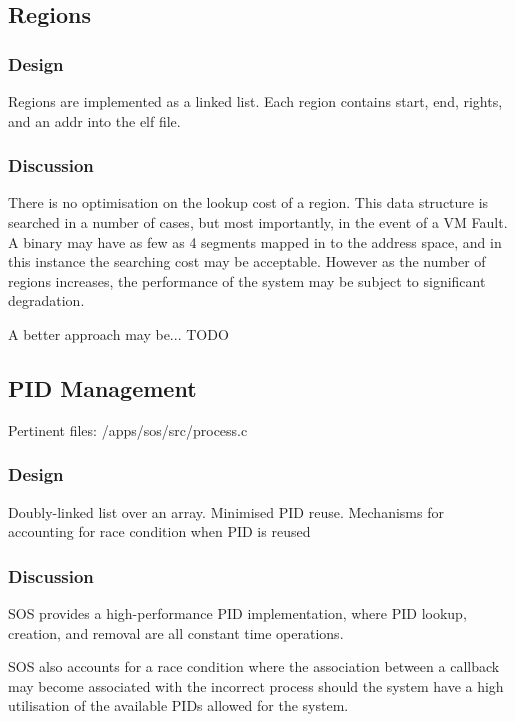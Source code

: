 \documentclass[a4paper,12pt]{article}
\begin{document}
\subsection{Regions}
\subsubsection{Design}
Regions are implemented as a linked list.  Each region contains start, end,
rights, and an addr into the elf file.
\subsubsection{Discussion}
There is no optimisation on the lookup cost of a region.  This data structure
is searched in a number of cases, but most importantly, in the event of a VM
Fault.  A binary may have as few as 4 segments mapped in to the address space,
and in this instance the searching cost may be acceptable.  However as the
number of regions increases, the performance of the system may be subject to
significant degradation.

A better approach may be... TODO

\subsection{PID Management}
Pertinent files: /apps/sos/src/process.c

\subsubsection{Design}
Doubly-linked list over an array.
Minimised PID reuse.
Mechanisms for accounting for race condition when PID is reused

\subsubsection{Discussion}
SOS provides a high-performance PID implementation, where PID lookup,
creation, and removal are all constant time operations.

SOS also accounts for a race condition where the association between a
callback may become associated with the incorrect process should the system
have a high utilisation of the available PIDs allowed for the system.
\end{document}
